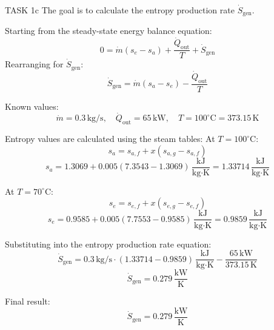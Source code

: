 TASK 1c  
The goal is to calculate the entropy production rate \( \dot{S}_{\text{gen}} \).  

Starting from the steady-state energy balance equation:  
\[
0 = \dot{m}(s_e - s_a) + \frac{\dot{Q}_{\text{out}}}{T} + \dot{S}_{\text{gen}}
\]  
Rearranging for \( \dot{S}_{\text{gen}} \):  
\[
\dot{S}_{\text{gen}} = \dot{m}(s_a - s_e) - \frac{\dot{Q}_{\text{out}}}{T}
\]  

Known values:  
\[
\dot{m} = 0.3 \, \text{kg/s}, \quad \dot{Q}_{\text{out}} = 65 \, \text{kW}, \quad T = 100^\circ\text{C} = 373.15 \, \text{K}
\]  

Entropy values are calculated using the steam tables:  
At \( T = 100^\circ\text{C} \):  
\[
s_a = s_{a,f} + x(s_{a,g} - s_{a,f})
\]  
\[
s_a = 1.3069 + 0.005(7.3543 - 1.3069) \, \frac{\text{kJ}}{\text{kg·K}} = 1.33714 \, \frac{\text{kJ}}{\text{kg·K}}
\]  

At \( T = 70^\circ\text{C} \):  
\[
s_e = s_{e,f} + x(s_{e,g} - s_{e,f})
\]  
\[
s_e = 0.9585 + 0.005(7.7553 - 0.9585) \, \frac{\text{kJ}}{\text{kg·K}} = 0.9859 \, \frac{\text{kJ}}{\text{kg·K}}
\]  

Substituting into the entropy production rate equation:  
\[
\dot{S}_{\text{gen}} = 0.3 \, \text{kg/s} \cdot (1.33714 - 0.9859) \, \frac{\text{kJ}}{\text{kg·K}} - \frac{65 \, \text{kW}}{373.15 \, \text{K}}
\]  
\[
\dot{S}_{\text{gen}} = 0.279 \, \frac{\text{kW}}{\text{K}}
\]  

Final result:  
\[
\dot{S}_{\text{gen}} = 0.279 \, \frac{\text{kW}}{\text{K}}
\]